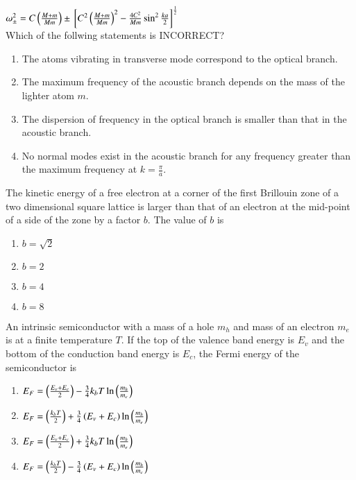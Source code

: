 \documentclass[journal]{IEEEtran}
\begin{document}
\begin{enumerate}
{{$\omega_\pm^2=C\left(\frac{M+m}{Mm}\right)\pm{}\left[C^2\left(\frac{M+m}{Mm}\right)^2-\frac{4C^2}{Mm}\sin^2\frac{ka}{2}\right]^{\frac{1}{2}}$\\
Which of the follwing statements is INCORRECT?
\begin{enumerate}
\item The atoms vibrating in transverse mode correspond to the optical branch.
\item The maximum frequency of the acoustic branch depends on the mass of the lighter atom $m$.
\item The dispersion of frequency in the optical branch is smaller than that in the acoustic branch.
\item No normal modes exist in the acoustic branch for any frequency greater than the maximum frequency at $k=\frac{\pi}{a}$.
\end{enumerate}
}
\item{
The kinetic energy of a free electron at a corner of the first Brillouin zone of a two dimensional square lattice is larger than that of an electron at the mid-point of a side of the zone by a factor $b$. The value of $b$ is 
\begin{multicols}{4}
\begin{enumerate}
\item $b=\sqrt{2}$
\item $b=2$
\item $b=4$
\item $b=8$
\end{enumerate}
\end{multicols}
}
\item{
An intrinsic semiconductor with a mass of a hole $m_h$ and mass of an electron $m_e$ is at a finite temperature $T$. If the top of the valence band energy is $E_v$ and the bottom of the conduction band energy is $E_c$, the Fermi energy of the semiconductor is  
\begin{multicols}{2}
\begin{enumerate}
\item $E_F=\left(\frac{E_v+E_c}{2}\right)-\frac{3}{4}k_bT\ln\left(\frac{m_h}{m_e}\right)$
\item $E_F=\left(\frac{k_bT}{2}\right)+\frac{3}{4}\left(E_v+E_c\right)\ln\left(\frac{m_h}{m_e}\right)$
\item $E_F=\left(\frac{E_v+E_c}{2}\right)+\frac{3}{4}k_bT\ln\left(\frac{m_h}{m_e}\right)$
\item $E_F=\left(\frac{k_bT}{2}\right)-\frac{3}{4}\left(E_v+E_c\right)\ln\left(\frac{m_h}{m_e}\right)$
\end{enumerate}
\end{multicols}
}}
\end{enumerate}
\end{document}
